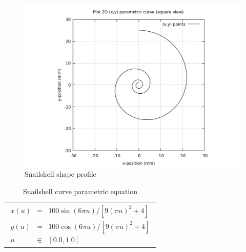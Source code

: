 \clearpage
\pagebreak

\begin{figure}
	\caption{Snailshell shape profile}
	\label{Snailshell-curve-plot-BW.pdf}
	\centering
	\includegraphics[width=1.20\textwidth]{Chap3/curve-shape/curves/Snailshell-curve-plot-BW.pdf} 
\end{figure}


\begin{table}[ht]
\begin{center}
\begin{tabular}{ p{16.0cm} }
\caption{Snailshell curve parametric equation}
\begin{eqnarray}
	x(u) & = & 100\sin(6\pi u) / [9 (\pi u)^2 + 4] \nonumber \\   
	y(u) & = & 100\cos(6\pi u) / [9 (\pi u)^2 + 4] \nonumber \\
	u & \in & [0.0, 1.0] \nonumber
\end{eqnarray}
\end{tabular}
\end{center}
\end{table}


\clearpage
\pagebreak

